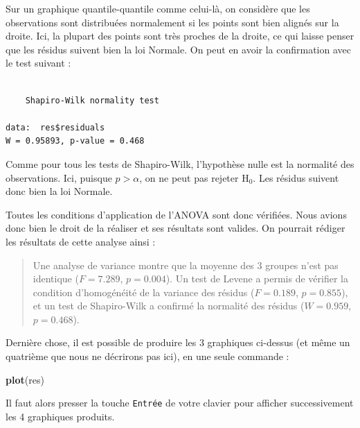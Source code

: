 \documentclass[
  a4paper,
]{article}
\newenvironment{Shaded}{\begin{snugshade}}{\end{snugshade}}
\newcommand{\KeywordTok}[1]{\textcolor[rgb]{0.12,0.11,0.11}{\textbf{#1}}}
\newcommand{\NormalTok}[1]{\textcolor[rgb]{0.12,0.11,0.11}{#1}}
\newcommand{\OperatorTok}[1]{\textcolor[rgb]{0.12,0.11,0.11}{#1}}
\begin{document}
Sur un graphique quantile-quantile comme celui-là, on considère que les observations sont distribuées normalement si les points sont bien alignés sur la droite. Ici, la plupart des points sont très proches de la droite, ce qui laisse penser que les résidus suivent bien la loi Normale. On peut en avoir la confirmation avec le test suivant :

\begin{Shaded}
\end{Shaded}

\begin{verbatim}

    Shapiro-Wilk normality test

data:  res$residuals
W = 0.95893, p-value = 0.468
\end{verbatim}

Comme pour tous les tests de Shapiro-Wilk, l'hypothèse nulle est la normalité des observations. Ici, puisque \(p > \alpha\), on ne peut pas rejeter H\(_0\). Les résidus suivent donc bien la loi Normale.

Toutes les conditions d'application de l'ANOVA sont donc vérifiées. Nous avions donc bien le droit de la réaliser et ses résultats sont valides. On pourrait rédiger les résultats de cette analyse ainsi :

\begin{quote}
Une analyse de variance montre que la moyenne des 3 groupes n'est pas identique (\(F = 7.289\), \(p = 0.004\)). Un test de Levene a permis de vérifier la condition d'homogénéité de la variance des résidus (\(F = 0.189\), \(p = 0.855\)), et un test de Shapiro-Wilk a confirmé la normalité des résidus (\(W = 0.959\), \(p = 0.468\)).
\end{quote}

Dernière chose, il est possible de produire les 3 graphiques ci-dessus (et même un quatrième que nous ne décrirons pas ici), en une seule commande :

\begin{Shaded}
\begin{Highlighting}[]
\KeywordTok{plot}\NormalTok{(res)}
\end{Highlighting}
\end{Shaded}

Il faut alors presser la touche \texttt{Entrée} de votre clavier pour afficher successivement les 4 graphiques produits.
\end{document}
